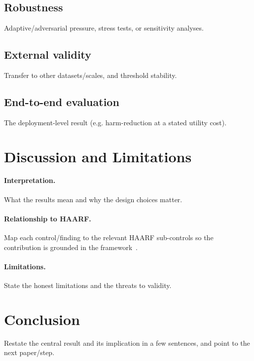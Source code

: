 \documentclass[11pt]{article}
\begin{document}
\subsection{Robustness}\label{sec:robustness}
Adaptive/adversarial pressure, stress tests, or sensitivity analyses.

\subsection{External validity}\label{sec:external}
Transfer to other datasets/scales, and threshold stability.

\subsection{End-to-end evaluation}\label{sec:endtoend}
The deployment-level result (e.g. harm-reduction at a stated utility cost).

\section{Discussion and Limitations}
\paragraph{Interpretation.} What the results mean and why the design choices matter.

\paragraph{Relationship to HAARF.} Map each control/finding to the relevant HAARF
sub-controls so the contribution is grounded in the framework~\cite{haarf2026}.

\paragraph{Limitations.} State the honest limitations and the threats to validity.

\section{Conclusion}
Restate the central result and its implication in a few sentences, and point to the
next paper/step.

\end{document}
